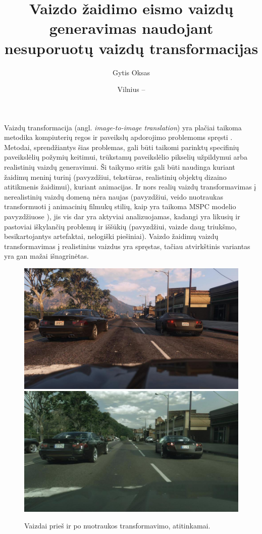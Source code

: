 \documentclass{VUMIFPSkursinis}
\institute{Informatikos institutas}
\title{Vaizdo žaidimo eismo vaizdų generavimas naudojant nesuporuotų vaizdų transformacijas}
\author{Gytis Oksas}
\date{Vilnius – \the\year}
\begin{document}
\maketitle

\tableofcontents

    Vaizdų transformacija (angl. \emph{image-to-image  translation}) yra plačiai taikoma metodika kompiuterių regos ir paveikslų apdorojimo problemoms spręsti \cite{ImTImTr}. Metodai, sprendžiantys šias problemas, gali būti taikomi parinktų specifinių paveikslėlių požymių keitimui, trūkstamų paveikslėlio pikselių užpildymui arba realistinių vaizdų generavimui. Ši taikymo sritis gali būti naudinga kuriant žaidimų meninį turinį (pavyzdžiui, tekstūras, realistinių objektų dizaino atitikmenis žaidimui), kuriant animacijas. Ir nors realių vaizdų transformavimas į nerealistinių vaizdų domeną nėra naujas (pavyzdžiui, veido nuotraukas transformuoti į animacinių filmukų stilių, kaip yra taikoma MSPC modelio pavyzdžiuose \cite{Mspc}), jis vis dar yra aktyviai analizuojamas, kadangi yra likusių ir pastoviai iškylančių problemų ir iššūkių (pavyzdžiui, vaizde daug triukšmo, besikartojantys artefaktai, nelogiški piešiniai). Vaizdo žaidimų vaizdų transformavimas į realistinius vaizdus yra spręstas, tačiau atvirkštinis variantas yra gan mažai išnagrinėtas.

    \begin{figure}[H]
        \centering
        \includegraphics[scale=0.3]{img/EnPhEn_before}
        \includegraphics[scale=0.3]{img/EnPhEn_after}
        \caption{Vaizdai prieš ir po nuotraukos transformavimo, atitinkamai.\cite{EnPhEn}}
        \label{img:mlp}
    \end{figure}
    
\end{document}
